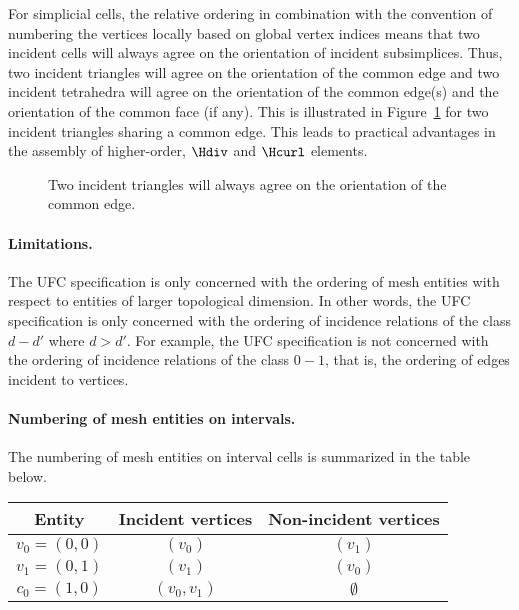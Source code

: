 For simplicial cells, the relative ordering in combination with the
convention of numbering the vertices locally based on global vertex
indices means that two incident cells will always agree on the
orientation of incident subsimplices. Thus, two incident triangles
will agree on the orientation of the common edge and two incident
tetrahedra will agree on the orientation of the common edge(s) and the
orientation of the common face (if any). This is illustrated in
Figure~\ref{fig:orientation_example_triangles} for two incident
triangles sharing a common edge. This leads to practical advantages in
the assembly of higher-order, $\Hdiv$ and $\Hcurl$ elements.

\begin{figure}[htbp]
  \begin{center}
    \caption{Two incident triangles will always agree on the
      orientation of the common edge.}
    \label{fig:orientation_example_triangles}
  \end{center}
\end{figure}

\paragraph{Limitations.}

The UFC specification is only concerned with the ordering of mesh
entities with respect to entities of larger topological dimension. In
other words, the UFC specification is only concerned with the ordering
of incidence relations of the class $d - d'$ where $d > d'$. For
example, the UFC specification is not concerned with the ordering of
incidence relations of the class $0 - 1$, that is, the ordering of
edges incident to vertices.

\paragraph{Numbering of mesh entities on intervals.}

The numbering of mesh entities on interval cells is summarized in the
table below.

\begin{center}
  \begin{tabular}{ccc}
    \toprule
    Entity & Incident vertices & Non-incident vertices \\
    \hline
    $v_0 = (0, 0)$ & $(v_0)$ & $(v_1)$ \\
    $v_1 = (0, 1)$ & $(v_1)$ & $(v_0)$ \\
    $c_0 = (1, 0)$ & $(v_0, v_1)$ & $\emptyset$ \\
    \bottomrule
  \end{tabular}
\end{center}

